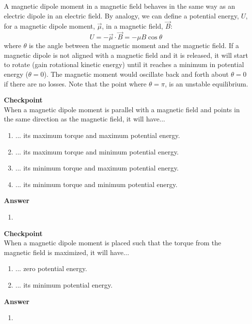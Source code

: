 A magnetic dipole moment in a magnetic field behaves in the same way as an electric dipole in an electric field. By analogy, we can define a potential energy, $U$, for a magnetic dipole moment, $\vec \mu$, in a magnetic field, $\vec B$:
\begin{equation}
\boxed{U =-\vec \mu \cdot \vec B =- \mu B \cos\theta}
\end{equation}
where $\theta$ is the angle between the magnetic moment and the magnetic field. If a magnetic dipole is not aligned with a magnetic field and it is released, it will start to rotate (gain rotational kinetic energy) until it reaches a minimum in potential energy ($\theta = 0$). The magnetic moment would oscillate back and forth about $\theta =0$ if there are no losses. Note that the point where $\theta = \pi$, is an unstable equilibrium.

\begin{framed}
\textbf{Checkpoint}\\
When a magnetic dipole moment is parallel with a magnetic field and points in the same direction as the magnetic field, it will have...

\begin{enumerate}
\item ... its maximum torque and maximum potential energy.
\item ... its maximum torque and minimum potential energy.
\item ... its minimum torque and maximum potential energy.
\item ... its minimum torque and minimum potential energy.
\end{enumerate}

\begin{framed}
\textbf{Answer}\\
\begin{enumerate}[resume]
\item
\end{enumerate}
\end{framed}
\end{framed}

\begin{framed}
\textbf{Checkpoint}\\
When a magnetic dipole moment is placed such that the torque from the magnetic field is maximized, it will have...

\begin{enumerate}
\item ... zero potential energy.
\item ... its minimum potential energy.
\end{enumerate}

\begin{framed}
\textbf{Answer}\\
\begin{enumerate}
\item
\end{enumerate}
\end{framed}
\end{framed}

